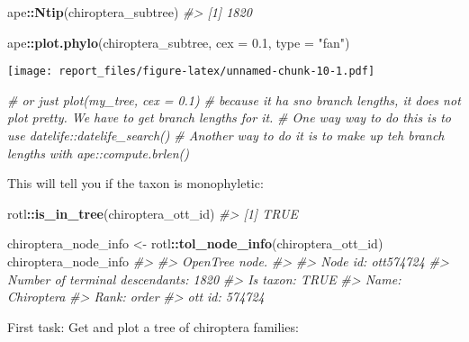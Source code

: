 \documentclass[]{article}
\newenvironment{Shaded}{\begin{snugshade}}{\end{snugshade}}
\newcommand{\CommentTok}[1]{\textcolor[rgb]{0.56,0.35,0.01}{\textit{#1}}}
\newcommand{\DataTypeTok}[1]{\textcolor[rgb]{0.13,0.29,0.53}{#1}}
\newcommand{\FloatTok}[1]{\textcolor[rgb]{0.00,0.00,0.81}{#1}}
\newcommand{\KeywordTok}[1]{\textcolor[rgb]{0.13,0.29,0.53}{\textbf{#1}}}
\newcommand{\NormalTok}[1]{#1}
\newcommand{\OperatorTok}[1]{\textcolor[rgb]{0.81,0.36,0.00}{\textbf{#1}}}
\newcommand{\StringTok}[1]{\textcolor[rgb]{0.31,0.60,0.02}{#1}}
\begin{document}
\begin{Shaded}
\begin{Highlighting}[]
\NormalTok{ape}\OperatorTok{::}\KeywordTok{Ntip}\NormalTok{(chiroptera_subtree)}
\CommentTok{#> [1] 1820}

\NormalTok{ape}\OperatorTok{::}\KeywordTok{plot.phylo}\NormalTok{(chiroptera_subtree, }\DataTypeTok{cex =} \FloatTok{0.1}\NormalTok{, }\DataTypeTok{type =} \StringTok{"fan"}\NormalTok{)}
\end{Highlighting}
\end{Shaded}

\texttt{[image: report\_files/figure-latex/unnamed-chunk-10-1.pdf]}

\begin{Shaded}
\begin{Highlighting}[]
\CommentTok{# or just plot(my_tree, cex = 0.1)}
\CommentTok{# because it ha sno branch lengths, it does not plot pretty. We have to get branch lengths for it.}
\CommentTok{# One way way to do this is to use datelife::datelife_search()}
\CommentTok{# Another way to do it is to make up teh branch lengths with ape::compute.brlen()}
\end{Highlighting}
\end{Shaded}

This will tell you if the taxon is monophyletic:

\begin{Shaded}
\begin{Highlighting}[]
\NormalTok{rotl}\OperatorTok{::}\KeywordTok{is_in_tree}\NormalTok{(chiroptera_ott_id)}
\CommentTok{#> [1] TRUE}
\end{Highlighting}
\end{Shaded}

\begin{Shaded}
\begin{Highlighting}[]
\NormalTok{chiroptera_node_info <-}\StringTok{ }\NormalTok{rotl}\OperatorTok{::}\KeywordTok{tol_node_info}\NormalTok{(chiroptera_ott_id)}
\NormalTok{chiroptera_node_info}
\CommentTok{#> }
\CommentTok{#> OpenTree node.}
\CommentTok{#> }
\CommentTok{#> Node id: ott574724}
\CommentTok{#> Number of terminal descendants: 1820}
\CommentTok{#> Is taxon: TRUE}
\CommentTok{#> Name: Chiroptera}
\CommentTok{#> Rank: order}
\CommentTok{#> ott id: 574724}
\end{Highlighting}
\end{Shaded}

First task: Get and plot a tree of chiroptera families:
\end{document}
